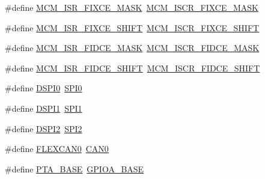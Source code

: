 \begin{DoxyCompactItemize}
\item 
\#define \mbox{\hyperlink{group___s_d_k___compatibility___symbols_ga91bb2a831a64c0915a1f7e798aaf1b3c}{M\+C\+M\+\_\+\+I\+S\+R\+\_\+\+F\+I\+X\+C\+E\+\_\+\+M\+A\+SK}}~\mbox{\hyperlink{group___m_c_m___register___masks_gad92657cd1980c03f0d15615a3c9f2989}{M\+C\+M\+\_\+\+I\+S\+C\+R\+\_\+\+F\+I\+X\+C\+E\+\_\+\+M\+A\+SK}}
\item 
\#define \mbox{\hyperlink{group___s_d_k___compatibility___symbols_ga77e3807fb3be264bbbcf2c8f788935e1}{M\+C\+M\+\_\+\+I\+S\+R\+\_\+\+F\+I\+X\+C\+E\+\_\+\+S\+H\+I\+FT}}~\mbox{\hyperlink{group___m_c_m___register___masks_gab9757207c9768c3f13461873bcb78d71}{M\+C\+M\+\_\+\+I\+S\+C\+R\+\_\+\+F\+I\+X\+C\+E\+\_\+\+S\+H\+I\+FT}}
\item 
\#define \mbox{\hyperlink{group___s_d_k___compatibility___symbols_ga4780723525e85d00fded39af33239306}{M\+C\+M\+\_\+\+I\+S\+R\+\_\+\+F\+I\+D\+C\+E\+\_\+\+M\+A\+SK}}~\mbox{\hyperlink{group___m_c_m___register___masks_ga0dc0741a93b687a65f28c5a1e109ba6e}{M\+C\+M\+\_\+\+I\+S\+C\+R\+\_\+\+F\+I\+D\+C\+E\+\_\+\+M\+A\+SK}}
\item 
\#define \mbox{\hyperlink{group___s_d_k___compatibility___symbols_ga09c2932c9c8be24db7eb56a1817ab097}{M\+C\+M\+\_\+\+I\+S\+R\+\_\+\+F\+I\+D\+C\+E\+\_\+\+S\+H\+I\+FT}}~\mbox{\hyperlink{group___m_c_m___register___masks_ga19c565ce09db7c0d22bf65f93d9aabfc}{M\+C\+M\+\_\+\+I\+S\+C\+R\+\_\+\+F\+I\+D\+C\+E\+\_\+\+S\+H\+I\+FT}}
\item 
\#define \mbox{\hyperlink{group___s_d_k___compatibility___symbols_gaa03782009be87fe8d39c2b87877d915d}{D\+S\+P\+I0}}~\mbox{\hyperlink{group___s_p_i___register___masks_gaf26e39c91b262cc480085abcc450d3d5}{S\+P\+I0}}
\item 
\#define \mbox{\hyperlink{group___s_d_k___compatibility___symbols_gac3d6587b19e1b7f583a96f1eb274605c}{D\+S\+P\+I1}}~\mbox{\hyperlink{group___s_p_i___register___masks_gad483be344a28ac800be8f03654a9612f}{S\+P\+I1}}
\item 
\#define \mbox{\hyperlink{group___s_d_k___compatibility___symbols_ga575463e14ad8e55caf3dd68037adda35}{D\+S\+P\+I2}}~\mbox{\hyperlink{group___s_p_i___register___masks_gaf2c3d8ce359dcfbb2261e07ed42af72b}{S\+P\+I2}}
\item 
\#define \mbox{\hyperlink{group___s_d_k___compatibility___symbols_gae1d4fa64db805f43d80adf2a1554146d}{F\+L\+E\+X\+C\+A\+N0}}~\mbox{\hyperlink{group___c_a_n___register___masks_ga8882ee5d18ec64b8193396ec6bc66fe5}{C\+A\+N0}}
\item 
\#define \mbox{\hyperlink{group___s_d_k___compatibility___symbols_ga6e3037b53880ddd4072d88ed493e6581}{P\+T\+A\+\_\+\+B\+A\+SE}}~\mbox{\hyperlink{group___g_p_i_o___register___masks_gad7723846cc5db8e43a44d78cf21f6efa}{G\+P\+I\+O\+A\+\_\+\+B\+A\+SE}}

\end{DoxyCompactItemize}
